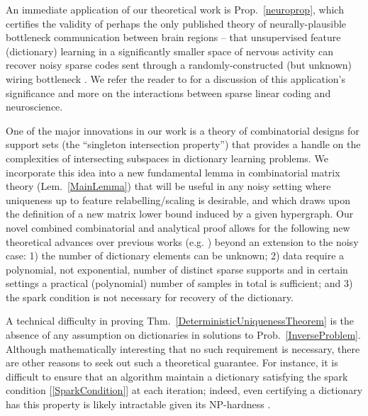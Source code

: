 \documentclass[9pt,twocolumn]{pnas-new}
\renewcommand{\eqref}[1]{\textnormal{[\ref{#1}]}}
\begin{document}
An immediate application of our theoretical work is Prop.~\ref{neuroprop}, which certifies the validity of perhaps the only published theory of neurally-plausible bottleneck communication between brain regions -- that unsupervised feature (dictionary) learning in a significantly smaller space of nervous activity can recover noisy sparse codes sent through a randomly-constructed (but unknown) wiring bottleneck \cite{Isely10}.  We refer the reader to \cite{ganguli2012compressed} for a discussion of this application's significance and more on the interactions between sparse linear coding and neuroscience.

One of the major innovations in our work is a theory of combinatorial designs for support sets (the ``singleton intersection property'') that provides a handle on the complexities of intersecting subspaces in dictionary learning problems. We incorporate this idea into a new fundamental lemma in combinatorial matrix theory (Lem.~\ref{MainLemma}) that will be useful in any noisy setting where uniqueness up to feature relabelling/scaling is desirable, and which draws upon the definition of a new matrix lower bound induced by a given hypergraph. Our novel combined combinatorial and analytical proof allows for the following new theoretical advances over previous works (e.g. \cite{Hillar15}) beyond an extension to the noisy case: 1) the number of dictionary elements can be unknown; 2) data require a polynomial, not exponential, number of distinct sparse supports and in certain settings a practical (polynomial) number of samples in total is sufficient; and 3) the spark condition is not necessary for recovery of the dictionary.

A technical difficulty in proving Thm.~\ref{DeterministicUniquenessTheorem} is the absence of any assumption on dictionaries in solutions to Prob.~\ref{InverseProblem}. Although mathematically interesting that no such requirement is necessary, there are other reasons to seek out such a theoretical guarantee. For instance, it is difficult to ensure that an algorithm maintain a dictionary satisfying the spark condition \eqref{SparkCondition} at each iteration; indeed, even certifying a dictionary has this property is likely intractable given its NP-hardness \cite{tillmann2014computational}.
\end{document}

